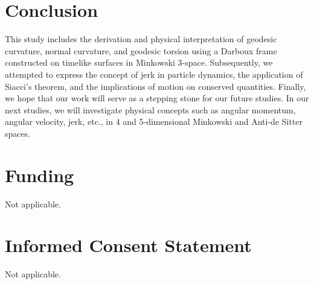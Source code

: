 \documentclass[reqno]{amsart}
\theoremstyle{plain}
\numberwithin{equation}{section}
\begin{document}
\section{Conclusion}

This study includes the derivation and physical interpretation of geodesic
curvature, normal curvature, and geodesic torsion using a Darboux frame
constructed on timelike surfaces in Minkowski 3-space. Subsequently, we
attempted to express the concept of jerk in particle dynamics, the
application of Siacci's theorem, and the implications of motion on conserved
quantities. Finally, we hope that our work will serve as a stepping stone
for our future studies. In our next studies, we will investigate physical
concepts such as angular momentum, angular velocity, jerk, etc., in 4 and
5-dimensional Minkowski and Anti-de Sitter spaces.

\section*{Funding}

Not applicable.

\section*{Informed Consent Statement}

Not applicable.

\end{document}
